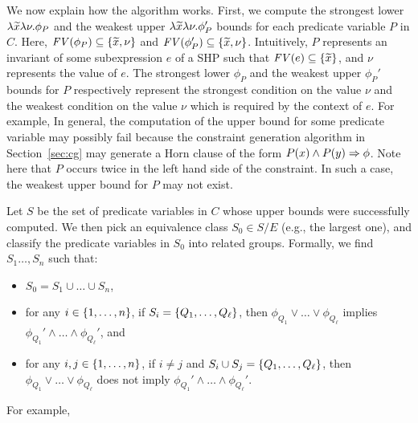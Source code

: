We now explain how the algorithm works.  First, we compute the strongest 
lower \(\lambda \widetilde{x}\lambda \nu.\phi_P\) and the weakest upper 
\(\lambda \widetilde{x}\lambda \nu.\phi_P'\) bounds for each predicate 
variable \(P\) in \(C\).  Here, \(\mathit{FV}({\phi_P}) \subseteq 
\{{\widetilde{x},\nu}\}\) and \(\mathit{FV}({\phi_P'}) \subseteq \{{\widetilde{x},\nu}\}\).  
Intuitively, \(P\) represents an invariant of some subexpression \(e\) 
of a SHP such that \(\mathit{FV}({e}) \subseteq \{{\widetilde{x}}\}\), and \(\nu\) 
represents the value of \(e\).  The strongest lower \(\phi_P\) and the 
weakest upper \(\phi_{P}'\) bounds for \(P\) respectively represent the 
strongest condition on the value \(\nu\) and the weakest condition on 
the value \(\nu\) which is required by the context of \(e\).  For 
example, \todo{}  In general, the computation of the upper bound for 
some predicate variable may possibly fail because the constraint 
generation algorithm in Section~\ref{sec:cg} may generate a Horn clause 
of the form \(P(x) \land P(y) \Rightarrow \phi\).  Note here that \(P\) 
occurs twice in the left hand side of the constraint.  In such a case, 
the weakest upper bound for \(P\) may not exist.

Let \(S\) be the set of predicate variables in \(C\) whose upper bounds 
were successfully computed.  We then pick an equivalence class \(S_0 \in 
S / E\) (e.g., the largest one), and classify the predicate variables in 
\(S_0\) into related groups.  %
%
Formally, we find \(S_1\dots,S_n\) such that:
\begin{itemize}
\item \(S_0 = S_1 \cup \dots \cup S_n\),
\item for any \(i \in \{{1,\dots,n}\}\), if \(S_i = 
\{{Q_1,\dots,Q_{\ell}}\}\), then \(\phi_{Q_1} \lor \dots \lor 
\phi_{Q_{\ell}}\) implies \(\phi_{Q_1}' \land \dots \land 
\phi_{Q_{\ell}}'\), and
\item for any \(i,j \in \{{1,\dots,n}\}\), if \(i \neq j\) and 
\(S_i \cup S_j = \{{Q_1,\dots,Q_{\ell}}\}\), then \(\phi_{Q_1} \lor 
\dots \lor \phi_{Q_{\ell}}\) does not imply \(\phi_{Q_1}' \land \dots 
\land \phi_{Q_{\ell}}'\).
\end{itemize}
For example, \todo{}

